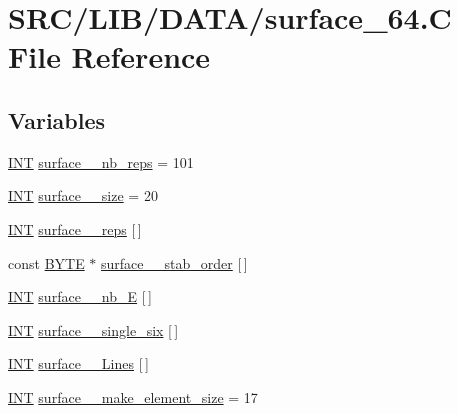 \hypertarget{surface__64_8_c}{}\section{S\+R\+C/\+L\+I\+B/\+D\+A\+T\+A/surface\+\_\+64.C File Reference}
\label{surface__64_8_c}
\subsection*{Variables}
\begin{DoxyCompactItemize}
\item 
\mbox{\hyperlink{galois_8h_a09fddde158a3a20bd2dcadb609de11dc}{I\+NT}} \mbox{\hyperlink{surface__64_8_c_a1a992b5751885ab63dc34eef564dead1}{surface\+\_\+\_\+nb\+\_\+reps}} = 101
\item 
\mbox{\hyperlink{galois_8h_a09fddde158a3a20bd2dcadb609de11dc}{I\+NT}} \mbox{\hyperlink{surface__64_8_c_ab61623dfdb8040e5c40703de333446cb}{surface\+\_\+\_\+size}} = 20
\item 
\mbox{\hyperlink{galois_8h_a09fddde158a3a20bd2dcadb609de11dc}{I\+NT}} \mbox{\hyperlink{surface__64_8_c_a1093672a214cd7263736af35948501c4}{surface\+\_\+\_\+reps}} \mbox{[}$\,$\mbox{]}
\item 
const \mbox{\hyperlink{galois_8h_ab6cc7b4aeb6ea31aba2b3fbfc83ff5e6}{B\+Y\+TE}} $\ast$ \mbox{\hyperlink{surface__64_8_c_aae9cb638cccd4e11420d9976e6bc54e1}{surface\+\_\+\_\+stab\+\_\+order}} \mbox{[}$\,$\mbox{]}
\item 
\mbox{\hyperlink{galois_8h_a09fddde158a3a20bd2dcadb609de11dc}{I\+NT}} \mbox{\hyperlink{surface__64_8_c_ae09c58bd2f1fcddeda7e2f25b0475178}{surface\+\_\+\_\+nb\+\_\+E}} \mbox{[}$\,$\mbox{]}
\item 
\mbox{\hyperlink{galois_8h_a09fddde158a3a20bd2dcadb609de11dc}{I\+NT}} \mbox{\hyperlink{surface__64_8_c_a658d701393ee3b252ad66592d4688574}{surface\+\_\+\_\+single\+\_\+six}} \mbox{[}$\,$\mbox{]}
\item 
\mbox{\hyperlink{galois_8h_a09fddde158a3a20bd2dcadb609de11dc}{I\+NT}} \mbox{\hyperlink{surface__64_8_c_ad95e6bcf8ba82c90342af39cd6ddb3a6}{surface\+\_\+\_\+\+Lines}} \mbox{[}$\,$\mbox{]}
\item 
\mbox{\hyperlink{galois_8h_a09fddde158a3a20bd2dcadb609de11dc}{I\+NT}} \mbox{\hyperlink{surface__64_8_c_a8d67a19ff6ac626ef424e87f831ed90c}{surface\+\_\+\_\+make\+\_\+element\+\_\+size}} = 17
\item 

\end{DoxyCompactItemize}
